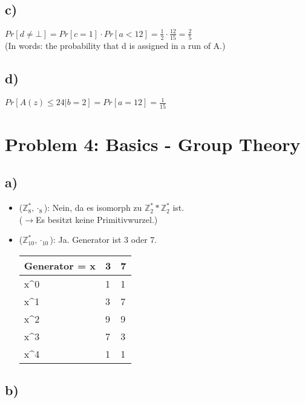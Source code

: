 \documentclass[12pt,pdftex,a4paper]{article}
\begin{document}
\subsection*{c)}
$Pr[d \neq \bot] = Pr[c = 1] \cdot Pr[a < 12] = \frac{1}{2} \cdot \frac{12}{15} = \frac{2}{5}$\\
(In words: the probability that d is assigned in a run of A.)

\subsection*{d)}
$Pr[A(z) \leq 24 | b = 2] = Pr[a = 12] = \frac{1}{15}$

\section*{Problem 4: Basics - Group Theory}
\subsection*{a)}
\begin{itemize}
	\item ($ \mathds{Z}^*_{8}, \cdot_{8} $): Nein, da es isomorph zu $ \mathds{Z}^*_2 * \mathds{Z}^*_2 $ ist.\\
	($ \rightarrow $Es besitzt keine Primitivwurzel.)
	\item ($ \mathds{Z}^*_{10}, \cdot_{10} $): Ja. Generator ist 3 oder 7.\\
    \begin{table}[!h]
    	\centering
    	\begin{tabular}{|l|l|l|}
    		\hline
    		Generator = x        & 3 & 7 \\ \hline
    		x\textasciicircum{}0 & 1 & 1 \\ \hline
    		x\textasciicircum{}1 & 3 & 7 \\ \hline
    		x\textasciicircum{}2 & 9 & 9 \\ \hline
    		x\textasciicircum{}3 & 7 & 3 \\ \hline
    		x\textasciicircum{}4 & 1 & 1 \\ \hline
    	\end{tabular}
    \end{table}
\end{itemize}

\subsection*{b)}
\end{document}
